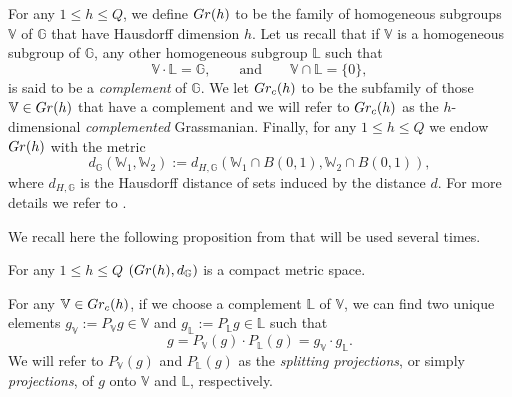 \documentclass[10pt, a4paper,
oneside, headinclude,footinclude]{scrartcl}
\begin{document}
\begin{definizione}\label{def:Grassmannian}
For any $1\leq h\leq Q$, we define $Gr(h)$ to be the family of homogeneous subgroups $\mathbb V$ of $\mathbb{G}$ that have Hausdorff dimension $h$. 
Let us recall that if $\mathbb{V}$ is a homogeneous subgroup of $\mathbb{G}$, any other homogeneous subgroup $\mathbb L$ such that
$$
\mathbb{V}\cdot\mathbb{L}=\mathbb{G},\qquad \text{and}\qquad \mathbb{V}\cap \mathbb{L}=\{0\},
$$
is said to be a \emph{complement} of $\mathbb{G}$. We let $Gr_c(h)$ to be the subfamily of those $\mathbb V\in Gr(h)$ that have a complement and we will refer to $Gr_c(h)$ as the $h$-dimensional \emph{complemented} Grassmanian. 
Finally, for any $1\leq h\leq Q$ we endow $Gr(h)$ with the metric
$$
d_{\mathbb G}(\mathbb W_1,\mathbb W_2):=d_{H,\mathbb G}(\mathbb W_1\cap B(0,1),\mathbb W_2\cap B(0,1)),
$$
where $d_{H,\mathbb G}$ is the Hausdorff distance of sets induced by the distance $d$. For more details we refer to \cite{antonelli2020rectifiable}.
\end{definizione}

We recall here the following proposition from \cite[Proposition 2.7]{antonelli2020rectifiable} that will be used several times.
\begin{proposizione}\label{prop:CompGrassmannian}
For any $1\leq h\leq Q$ $(Gr(h),d_{\mathbb G})$ is a compact metric space. 
\end{proposizione}


\begin{definizione}\label{def:Projections}
For any $\mathbb V\in Gr_c(h)$, if we choose a complement $\mathbb L$ of $\mathbb V$, we can find two unique elements $g_{\mathbb V}:=P_\mathbb V g\in \mathbb V$ and $g_{\mathbb L}:=P_{\mathbb L}g\in \mathbb L$ such that
$$
g=P_\mathbb V (g)\cdot P_{\mathbb L}(g)=g_{\mathbb V}\cdot g_{\mathbb L}.
$$
We will refer to $P_{\mathbb V}(g)$ and $P_{\mathbb L}(g)$ as the \emph{splitting projections}, or simply {\em projections}, of $g$ onto $\mathbb V$ and $\mathbb L$, respectively.
\end{definizione}
\end{document}
